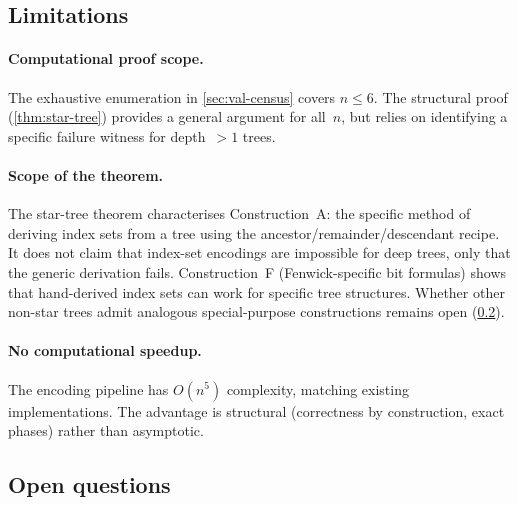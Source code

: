\subsection{Limitations}

\paragraph{Computational proof scope.}
The exhaustive enumeration in \cref{sec:val-census} covers
$n \le 6$.  The structural proof (\cref{thm:star-tree}) provides a
general argument for all~$n$, but relies on identifying a specific
failure witness for depth~$> 1$ trees.

\paragraph{Scope of the theorem.}
The star-tree theorem characterises Construction~A: the specific
method of deriving index sets from a tree using the
ancestor/remainder/descendant recipe.  It does not claim that
index-set encodings are impossible for deep trees, only that the
generic derivation fails.  Construction~F (Fenwick-specific bit
formulas) shows that hand-derived index sets can work for specific
tree structures.  Whether other non-star trees admit analogous
special-purpose constructions remains open (\cref{sec:open-q}).

\paragraph{No computational speedup.}
The encoding pipeline has $O(n^5)$ complexity, matching existing
implementations.  The advantage is structural (correctness by
construction, exact phases) rather than asymptotic.

\subsection{Open questions}
\label{sec:open-q}

